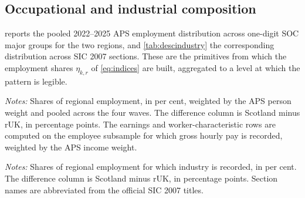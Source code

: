 \subsection{Occupational and industrial composition}

 reports the pooled 2022--2025 APS employment distribution across one-digit SOC major groups for the two regions, and \cref{tab:descindustry} the corresponding distribution across SIC 2007 sections. These are the primitives from which the employment shares $\eta_{k,r}$ of \cref{eq:indices} are built, aggregated to a level at which the pattern is legible.

\begin{table}[h]
\centering
\caption{Employment composition by SOC major group, pooled APS 2022--2025}
\label{tab:descriptives}
\small

\begin{minipage}{0.92\textwidth}
\vspace{0.4em}\footnotesize
\textit{Notes:} Shares of regional employment, in per cent, weighted by the APS person weight and pooled across the four waves. The difference column is Scotland minus rUK, in percentage points. The earnings and worker-characteristic rows are computed on the employee subsample for which gross hourly pay is recorded, weighted by the APS income weight.
\end{minipage}
\end{table}

\begin{table}[h]
\centering
\caption{Employment composition by SIC 2007 section, pooled APS 2022--2025}
\label{tab:descindustry}
\small

\begin{minipage}{0.92\textwidth}
\vspace{0.4em}\footnotesize
\textit{Notes:} Shares of regional employment for which industry is recorded, in per cent. The difference column is Scotland minus rUK, in percentage points. Section names are abbreviated from the official SIC 2007 titles.
\end{minipage}
\end{table}

